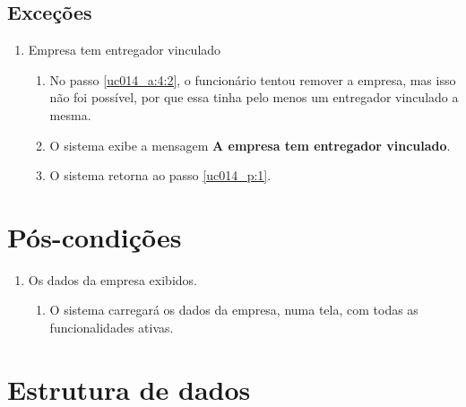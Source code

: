 \subsection{Exceções}

\begin{enumerate}[label=E\arabic*]
	\item Empresa tem entregador vinculado \label{uc014_e:1}
	\begin{enumerate}[label*=.\arabic*]
		\item[] No passo \ref{uc014_a:4:2}, o funcionário tentou remover a empresa, mas isso não foi possível, por que essa tinha pelo menos um entregador vinculado a mesma.
		\item O sistema exibe a mensagem \textbf{A empresa tem entregador vinculado}.
		\item O sistema retorna ao passo \ref{uc014_p:1}.
	\end{enumerate}
\end{enumerate}

\section{Pós-condições}

\begin{enumerate}
	\item Os dados da empresa exibidos.
	\begin{enumerate}
		\item O sistema carregará os dados da empresa, numa tela, com todas as funcionalidades ativas.
	\end{enumerate}
\end{enumerate}

\section{Estrutura de dados}

